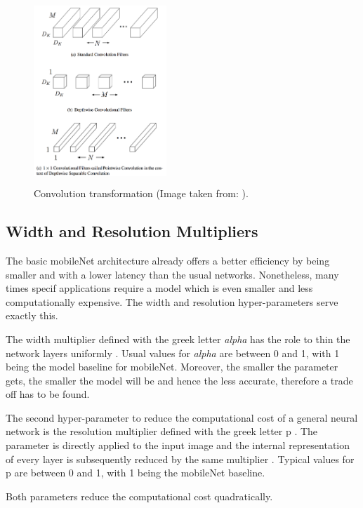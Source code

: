 \begin{figure}[!htbp]
\begin{center}
\includegraphics[width=5cm,height=7cm,keepaspectratio]{images/convolutions.png}
\end{center}
\caption{Convolution transformation (Image taken from: \cite{paper:MobileNets}).}
\end{figure}

\subsection{Width and Resolution Multipliers}

The basic mobileNet architecture already offers a better efficiency by being smaller and with a lower latency than the usual networks. Nonetheless, many times specif applications require a model which is even smaller and less computationally expensive. The width and resolution hyper-parameters serve exactly this.

The width multiplier defined with the greek letter \textit{alpha} has the role to thin the network layers uniformly \cite{paper:MobileNets}. Usual values for \textit{alpha} are between 0 and 1, with 1 being the model baseline for mobileNet. Moreover, the smaller the parameter gets, the smaller the model will be and hence the less accurate, therefore a trade off has to be found.

The second hyper-parameter to reduce the computational cost of a general neural network is the resolution multiplier defined with the greek letter p \cite{paper:MobileNets}. The parameter is directly applied to the input image and the internal representation of every layer is subsequently reduced by the same multiplier \cite{paper:MobileNets}. Typical values for p are between 0 and 1, with 1 being the mobileNet baseline.

Both parameters reduce the computational cost quadratically.

